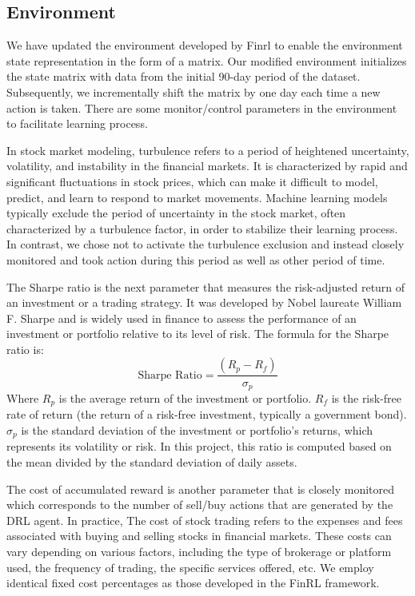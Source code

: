 {\subsection{Environment}
We have updated the environment developed by Finrl to enable the environment state representation in the form of a matrix. Our modified environment initializes the state matrix with data from the initial 90-day period of the dataset. Subsequently, we incrementally shift the matrix by one day each time a new action is taken. There are some monitor/control parameters in the environment to facilitate learning process.

In stock market modeling, turbulence refers to a period of heightened uncertainty, volatility, and instability in the financial markets. It is characterized by rapid and significant fluctuations in stock prices, which can make it difficult to model, predict, and learn to respond to market movements. 
Machine learning models typically exclude the period of uncertainty in the stock market, often characterized by a turbulence factor, in order to stabilize their learning process. In contrast, we chose not to activate the turbulence exclusion and instead closely monitored and took action during this period as well as other period of time.


The Sharpe ratio is the next parameter that measures the risk-adjusted return of an investment or a trading strategy. It was developed by Nobel laureate William F. Sharpe and is widely used in finance to assess the performance of an investment or portfolio relative to its level of risk.
The formula for the Sharpe ratio is:
\begin{equation}
\text{Sharpe Ratio} = \frac{(R_p-R_f)}{\sigma_p}
\end{equation}
Where $R_p$ is the average return of the investment or portfolio. $ R_f$ is the risk-free rate of return (the return of a risk-free investment, typically a government bond).  $\sigma_p$ is the standard deviation of the investment or portfolio's returns, which represents its volatility or risk. 
In this project, this ratio is computed based on the mean divided by the standard deviation of daily assets.


The cost of accumulated reward is another parameter that is closely monitored which corresponds to the number of sell/buy actions that are generated by the DRL agent. In practice, The cost of stock trading refers to the expenses and fees associated with buying and selling stocks in financial markets. These costs can vary depending on various factors, including the type of brokerage or platform used, the frequency of trading, the specific services offered, etc. We employ identical fixed cost percentages as those developed in the FinRL framework. 

}
